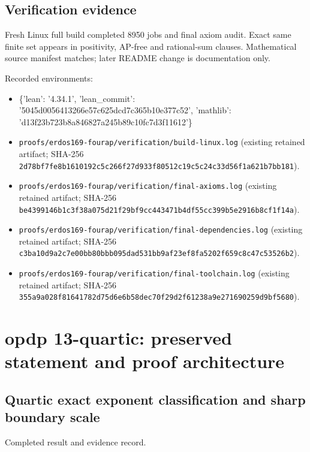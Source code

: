\documentclass[11pt,a4paper]{article}
\begin{document}
\subsection{Verification evidence}
Fresh Linux full build completed 8950 jobs and final axiom audit. Exact same finite set appears in positivity, AP-free and rational-sum clauses. Mathematical source manifest matches; later README change is documentation only.

Recorded environments:

\begin{itemize}
\item \{'lean': '4.34.1', 'lean\_commit': '5045d0056413266e57c625dcd7c365b10e377c52', 'mathlib': 'd13f23b723b8a846827a245b89c10fc7d3f11612'\}
\end{itemize}
\begin{itemize}
\item \texttt{proofs/erdos169-fourap/verification/build-linux.log} (existing retained artifact; SHA-256 \texttt{2d78bf7fe8b1610192c5c266f27d933f80512c19c5c24c33d56f1a621b7bb181}).
\end{itemize}
\begin{itemize}
\item \texttt{proofs/erdos169-fourap/verification/final-axioms.log} (existing retained artifact; SHA-256 \texttt{be4399146b1c3f38a075d21f29bf9cc443471b4df55cc399b5e2916b8cf1f14a}).
\end{itemize}
\begin{itemize}
\item \texttt{proofs/erdos169-fourap/verification/final-dependencies.log} (existing retained artifact; SHA-256 \texttt{c3ba10d9a2c7e00bb80bbb095dad531bb9af23ef8fa5202f659c8c47c53526b2}).
\end{itemize}
\begin{itemize}
\item \texttt{proofs/erdos169-fourap/verification/final-toolchain.log} (existing retained artifact; SHA-256 \texttt{355a9a028f81641782d75d6e6b58dec70f29d2f61238a9e271690259d9bf5680}).
\end{itemize}
\clearpage
\section{opdp 13-quartic: preserved statement and proof architecture}
\subsection{Quartic exact exponent classification and sharp boundary scale}
Completed result and evidence record.
\end{document}
